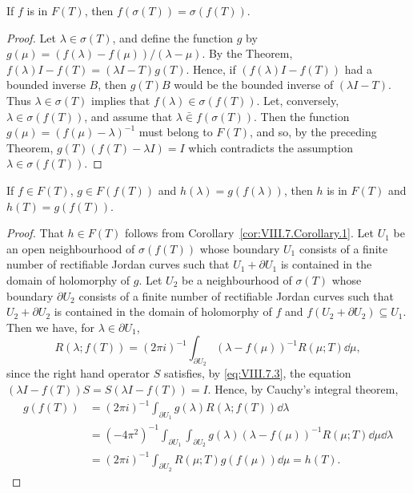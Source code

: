 \begin{corollary}\label{cor:VIII.7.Corollary.1} If $f$ is in $F(T)$, then $f(\sigma(T)) = \sigma(f(T))$. 
\end{corollary}

\begin{proof}
 Let $\lambda \in \sigma(T)$, and define the function $g$ by $g(\mu) = (f(\lambda) - f(\mu)) / (\lambda - \mu)$. By the Theorem, $f(\lambda)I - f(T) = (\lambda I - T)g(T)$. Hence, if $(f(\lambda)I - f(T))$ had a bounded inverse $B$, then $g(T)B$ would be the bounded inverse of $(\lambda I - T)$. Thus $\lambda \in \sigma(T)$ implies that $f(\lambda) \in \sigma(f(T))$. Let, conversely, $\lambda \in \sigma(f(T))$, and assume that $\lambda \bar{\in} f(\sigma(T))$. Then the function $g(\mu) = (f(\mu) - \lambda)^{-1}$ must belong to $F(T)$, and so, by the preceding Theorem, $g(T)(f(T) - \lambda I) = I$ which contradicts the assumption $\lambda \in \sigma(f(T))$. 
\end{proof}

\begin{corollary}\label{cor:VIII.7.Corollary.2} If $f \in F(T)$, $g \in F(f(T))$ and $h(\lambda) = g(f(\lambda))$, then $h$ is in $F(T)$ and $h(T) = g(f(T))$. 
\end{corollary}

\begin{proof}
 That $h \in F(T)$ follows from Corollary~\ref{cor:VIII.7.Corollary.1}. Let $U_{1}$ be an open neighbourhood of $\sigma(f(T))$ whose boundary $U_{1}$ consists of a finite number of rectifiable Jordan curves such that $U_{1} + \partial U_{1}$ is contained in the domain of holomorphy of $g$. Let $U_{2}$ be a neighbourhood of $\sigma(T)$ whose boundary $\partial U_{2}$ consists of a finite number of rectifiable Jordan curves such that $U_{2} + \partial U_{2}$ is contained in the domain of holomorphy of $f$ and $f(U_{2} + \partial U_{2}) \subseteq U_{1}$. Then we have, for $\lambda \in \partial U_{1}$, 
\[
R (\lambda ; f (T)) = (2 \pi i) ^{-1} \int_ {\partial U _{2}} (\lambda - f (\mu)) ^{-1} R (\mu ; T) \dd \mu ,
\]
since the right hand operator $S$ satisfies, by \eqref{eq:VIII.7.3}, the equation $(\lambda I - f(T)) S = S(\lambda I - f(T)) = I$. Hence, by Cauchy's integral theorem, 
\[
\begin{aligned}
g (f (T)) &= (2 \pi i) ^{-1} \int_ {\partial U _{1}} g (\lambda) R (\lambda ; f (T)) \dd \lambda
\\
\qquad &= (- 4 \pi^{2}) ^{-1} \int_ {\partial U _{1}} \int_ {\partial U _{2}} g (\lambda) (\lambda - f (\mu)) ^{-1} R (\mu ; T) \dd \mu \dd \lambda
\\
\qquad &= (2 \pi i) ^{-1} \int_ {\partial U _{2}} R (\mu ; T) g (f (\mu)) \dd \mu = h (T). \end{aligned}
\]
\end{proof}


